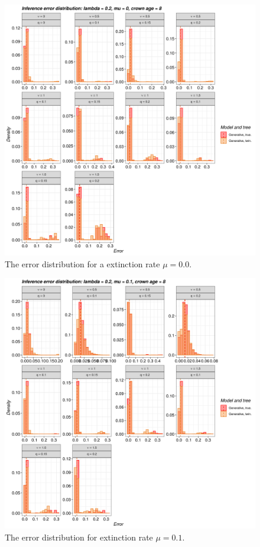 \begin{figure}[!htbp]
  \includegraphics[width=\textwidth]{20200204_figure_1a.png}
  \caption{
    The error distribution for a extinction rate $\mu = 0.0$.
  }
  \label{fig:errors_yule}
\end{figure}

\begin{figure}[!htbp]
  \includegraphics[width=\textwidth]{20200204_figure_1b.png}
  \caption{
    The error distribution for extinction rate $\mu = 0.1$.
  }
  \label{fig:errors_bd}
\end{figure}


